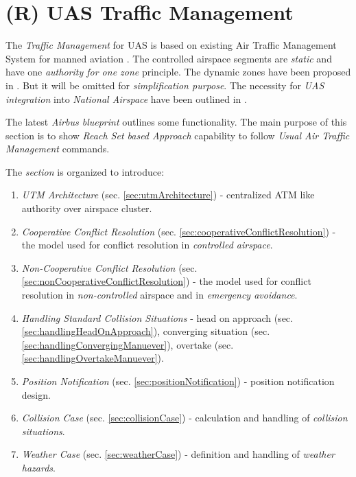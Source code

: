 \section{(R) UAS Traffic Management}\label{sec:UASTrafficManagement}

The \emph{Traffic Management} for UAS is based on existing Air Traffic Management System for manned aviation \cite{icao4444}. The controlled airspace segments are \emph{static} and have one \emph{authority for one zone} principle. The dynamic zones have been proposed in \cite{gerdes2016dynamic}. But it will be omitted for \emph{simplification purpose}. The necessity for \emph{UAS integration} into \emph{National Airspace} have been outlined in \cite{spriesterbach2013unmanned}.

The latest \emph{Airbus blueprint} \cite{airbusUTM2018blueprint} outlines some functionality. The main purpose of this section is to show \emph{Reach Set based Approach} capability to follow \emph{Usual Air Traffic Management} commands.

The \emph{section} is organized to introduce:
\begin{enumerate}
    \item \emph{UTM Architecture} (sec. \ref{sec:utmArchitecture}) - centralized ATM like authority over airspace cluster.
    
    \item \emph{Cooperative Conflict Resolution} (sec. \ref{sec:cooperativeConflictResolution}) - the model used for conflict resolution in \emph{controlled airspace}.
    
    \item \emph{Non-Cooperative Conflict Resolution} (sec. \ref{sec:nonCooperativeConflictResolution})  - the model used for conflict resolution in \emph{non-controlled} airspace and in \emph{emergency avoidance}.
    
    \item \emph{Handling Standard Collision Situations} - head on approach (sec. \ref{sec:handlingHeadOnApproach}), converging situation (sec. \ref{sec:handlingConvergingManuever}), overtake (sec. \ref{sec:handlingOvertakeManuever}).
    
    \item \emph{Position Notification} (sec. \ref{sec:positionNotification}) - position notification design.
    
    \item \emph{Collision Case} (sec. \ref{sec:collisionCase}) - calculation and handling of \emph{collision situations}.
    
    \item \emph{Weather Case} (sec. \ref{sec:weatherCase}) - definition and handling of \emph{weather hazards}.
\end{enumerate}